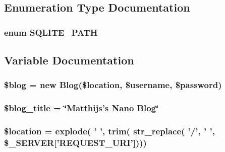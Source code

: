 \subsection{Enumeration Type Documentation}
\hypertarget{Bootstrap_8php_6c0b526c01fb7fbb58a9ff1508514cb2}{
\subsubsection[{SQLITE\_\-PATH}]{\setlength{\rightskip}{0pt plus 5cm}enum {\bf SQLITE\_\-PATH}}}
\label{Bootstrap_8php_6c0b526c01fb7fbb58a9ff1508514cb2}




\subsection{Variable Documentation}
\hypertarget{Bootstrap_8php_44ed435614c09351c778ca04cd3800de}{
\subsubsection[{\$blog}]{\setlength{\rightskip}{0pt plus 5cm}\$blog = new {\bf Blog}(\$location, \$username, \$password)}}
\label{Bootstrap_8php_44ed435614c09351c778ca04cd3800de}


\hypertarget{Bootstrap_8php_ede271528177a2e46dd058163b89d0a5}{
\subsubsection[{\$blog\_\-title}]{\setlength{\rightskip}{0pt plus 5cm}\$blog\_\-title = \char`\"{}Matthijs's {\bf Nano} {\bf Blog}\char`\"{}}}
\label{Bootstrap_8php_ede271528177a2e46dd058163b89d0a5}


\hypertarget{Bootstrap_8php_c319193077976bb217112e5a7b7b8022}{
\subsubsection[{\$location}]{\setlength{\rightskip}{0pt plus 5cm}\$location = explode( ' ', trim( str\_\-replace( '/', ' ', \$\_\-SERVER\mbox{[}'REQUEST\_\-URI'\mbox{]})))}}
\label{Bootstrap_8php_c319193077976bb217112e5a7b7b8022}


